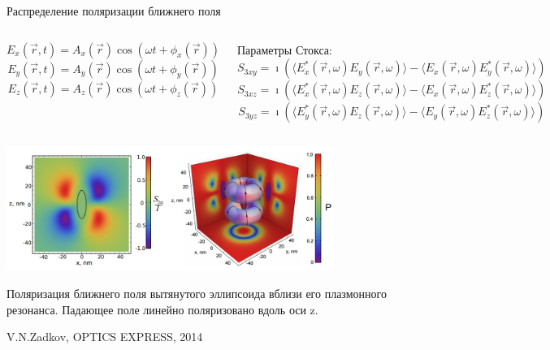 \documentclass[9pt, compress, xcolor=table]{beamer}
\begin{document}
\begin{frame}{Распределение поляризации ближнего поля}
\begin{columns}
\column{5cm}
\begin{equation*}
E_x(\vec r,t)=A_x(\vec r)\cos(\omega t + \phi_x(\vec  r))
\end{equation*}
\begin{equation*}
E_y(\vec r,t)=A_y(\vec r)\cos(\omega t + \phi_y(\vec  r))
\end{equation*}
\begin{equation*}
E_z(\vec r,t)=A_z(\vec r)\cos(\omega t + \phi_z(\vec  r))
\end{equation*}
\column{7cm}

Параметры Стокса:
\begin{equation*}
S_{3xy}=\imath(\langle E_x^*(\vec r, \omega) E_y(\vec r, \omega)\rangle-\langle E_x(\vec r, \omega) E_y^*(\vec r, \omega)\rangle )
\end{equation*}
\begin{equation*}
S_{3xz}=\imath(\langle E_x^*(\vec r, \omega) E_z(\vec r, \omega)\rangle-\langle E_x(\vec r, \omega) E_z^*(\vec r, \omega)\rangle )
\end{equation*}
\begin{equation*}
S_{3yz}=\imath(\langle E_y^*(\vec r, \omega) E_z(\vec r, \omega)\rangle-\langle E_y(\vec r, \omega) E_z^*(\vec r, \omega)\rangle )
\end{equation*}
\end{columns}
\begin{center}
\includegraphics[width=0.8\textwidth]{polar}
\end{center}

Поляризация ближнего поля вытянутого эллипсоида вблизи его плазмонного резонанса. Падающее поле линейно поляризовано вдоль оси z.

\scriptsize{V.N.Zadkov, OPTICS EXPRESS, 2014}

\end{frame}
\end{document}
